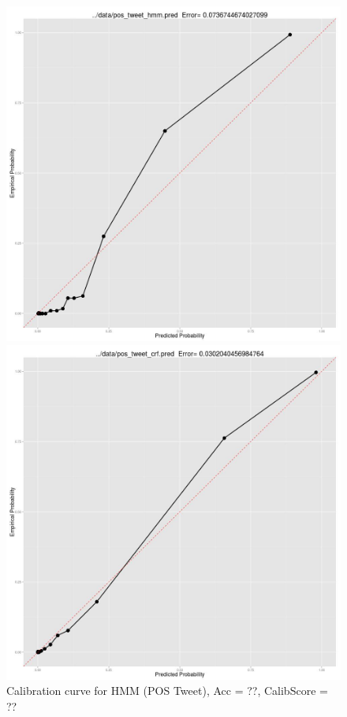 \begin{figure}[t]
  \includegraphics[width=\linewidth]{pos_tweet_hmm_pred.jpg}
  \caption{Calibration curve for HMM (POS Tweet), Acc = ??, CalibScore = ??}
  \label{fig:pos_tweet_hmm_pred}
\endminipage\hfill
{}
  \includegraphics[width=\linewidth]{pos_tweet_crf_pred.jpg}

\end{figure}
